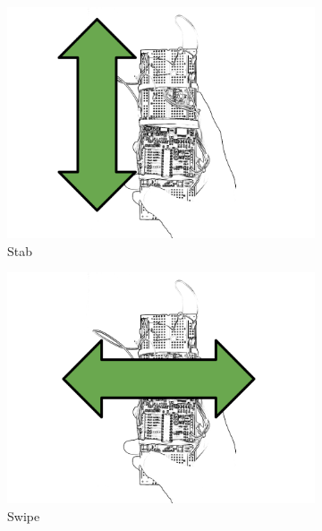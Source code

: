 \documentclass[12pt]{article}
\begin{document}
\begin{figure}[h!]
\begin{center}
    \begin{subfigure}[b]{0.2\textwidth}
            \includegraphics[width=\textwidth]{gesture-stab.png}
            \caption{Stab}
            \label{fig:stab}
    \end{subfigure}
    \begin{subfigure}[b]{0.2\textwidth}
            \includegraphics[width=\textwidth]{gesture-swipe.png}
            \caption{Swipe}
            \label{fig:swipe}
    \end{subfigure}
    \begin{subfigure}[b]{0.2\textwidth}

\end{subfigure}
\end{center}
\end{figure}
\end{document}

